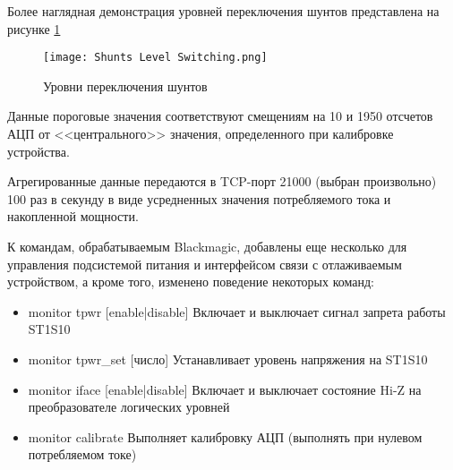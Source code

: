 Более наглядная демонстрация уровней переключения шунтов представлена на рисунке \ref{ris:Shunts Level Switching}

\begin{figure}
    \centering
    \texttt{[image: Shunts Level Switching.png]}
    \caption{Уровни переключения шунтов}
    \label{ris:Shunts Level Switching}
\end{figure}

Данные пороговые значения соответствуют смещениям на 10 и 1950 отсчетов АЦП 
от <<центрального>> значения, определенного при калибровке устройства.

Агрегированные данные передаются в TCP-порт 21000 (выбран произвольно) 100 раз в секунду в виде 
усредненных значения потребляемого тока и накопленной мощности.

К командам, обрабатываемым Blackmagic, добавлены еще несколько для управления подсистемой питания 
и интерфейсом связи с отлаживаемым устройством, а кроме того, изменено поведение некоторых команд:

\begin{itemize}
    \item monitor tpwr [enable|disable] Включает и выключает сигнал запрета работы ST1S10
    \item monitor tpwr\_set [число] Устанавливает уровень напряжения на ST1S10
    \item monitor iface [enable|disable] Включает и выключает состояние Hi-Z на преобразователе 
    логических уровней
    \item monitor calibrate Выполняет калибровку АЦП (выполнять при нулевом потребляемом токе)
\end{itemize}

